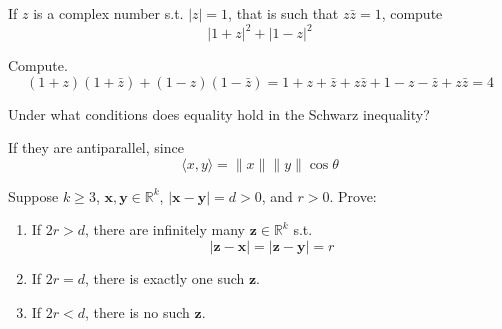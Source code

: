   \begin{exercise}[Rudin 1.14]
    If $z$ is a complex number s.t. $|z| = 1$, that is such that $z \bar{z} = 1$, compute 
    \begin{equation}
      |1 + z|^2 + |1 - z|^2
    \end{equation}
  \end{exercise}
  \begin{solution}
    Compute. 
    \begin{equation}
      (1 + z) (1 + \bar{z}) + (1 - z) (1 - \bar{z}) = 1 + z + \bar{z} + z \bar{z} + 1 - z - \bar{z} + z \bar{z} = 4
    \end{equation}
  \end{solution}

  \begin{exercise}[Rudin 1.15]
    Under what conditions does equality hold in the Schwarz inequality? 
  \end{exercise}
  \begin{solution}
    If they are antiparallel, since 
    \begin{equation}
      \langle x, y \rangle = \|x \| \|y \| \cos{\theta}
    \end{equation}
  \end{solution}

  \begin{exercise}[Rudin 1.16]
    Suppose $k \geq 3$, $\mathbf{x}, \mathbf{y} \in \mathbb{R}^k$, $|\mathbf{x} - \mathbf{y}| = d > 0$, and $r > 0$. Prove: 
    \begin{enumerate}
      \item[a)] If $2r > d$, there are infinitely many $\mathbf{z} \in \mathbb{R}^k$ s.t. 
        \begin{equation}
        |\mathbf{z} - \mathbf{x}| = |\mathbf{z} - \mathbf{y}| = r
        \end{equation}
      \item[b)] If $2r = d$, there is exactly one such $\mathbf{z}$. 
      \item[c)] If $2r < d$, there is no such $\mathbf{z}$. 
    \end{enumerate}
  \end{exercise}
  \begin{solution}
    
  \end{solution}

